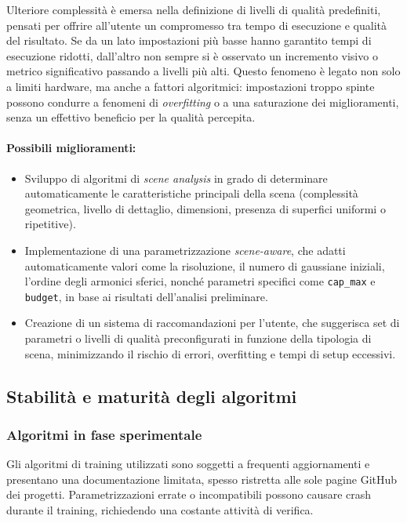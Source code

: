 Ulteriore complessità è emersa nella definizione di livelli di qualità predefiniti, pensati per offrire all’utente un compromesso tra tempo di esecuzione e qualità del risultato.  
Se da un lato impostazioni più basse hanno garantito tempi di esecuzione ridotti, dall’altro non sempre si è osservato un incremento visivo o metrico significativo passando a livelli più alti.  
Questo fenomeno è legato non solo a limiti hardware, ma anche a fattori algoritmici: impostazioni troppo spinte possono condurre a fenomeni di \emph{overfitting} o a una saturazione dei miglioramenti, senza un effettivo beneficio per la qualità percepita.

\paragraph{Possibili miglioramenti:}
\begin{itemize}
	\item Sviluppo di algoritmi di \emph{scene analysis} in grado di determinare automaticamente le caratteristiche principali della scena (complessità geometrica, livello di dettaglio, dimensioni, presenza di superfici uniformi o ripetitive).
	\item Implementazione di una parametrizzazione \emph{scene-aware}, che adatti automaticamente valori come la risoluzione, il numero di gaussiane iniziali, l'ordine degli armonici sferici, nonché parametri specifici come \texttt{cap\_max} e \texttt{budget}, in base ai risultati dell'analisi preliminare.
	\item Creazione di un sistema di raccomandazioni per l'utente, che suggerisca set di parametri o livelli di qualità preconfigurati in funzione della tipologia di scena, minimizzando il rischio di errori, overfitting e tempi di setup eccessivi.
\end{itemize}

\subsection{Stabilità e maturità degli algoritmi}
\subsubsection{Algoritmi in fase sperimentale}
Gli algoritmi di training utilizzati sono soggetti a frequenti aggiornamenti e presentano una documentazione limitata, spesso ristretta alle sole pagine GitHub dei progetti.  
Parametrizzazioni errate o incompatibili possono causare crash durante il training, richiedendo una costante attività di verifica.

